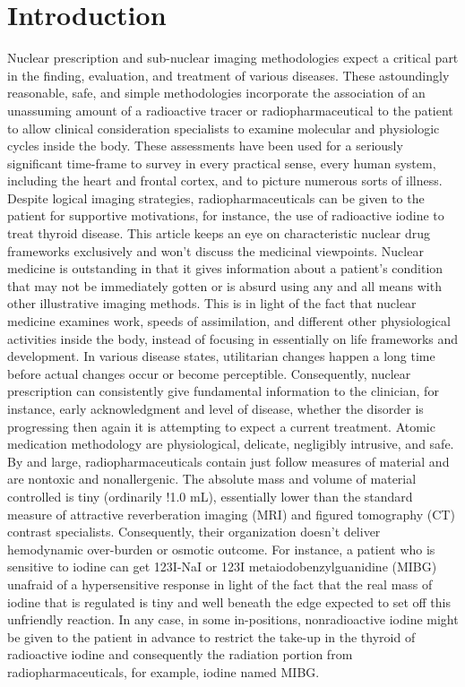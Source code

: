 \documentclass[12pt]{article}
\begin{document}
\section{Introduction}
Nuclear prescription and sub-nuclear imaging methodologies expect a critical part in the finding, evaluation, and treatment of various diseases. These astoundingly reasonable, safe, and simple methodologies incorporate the association of an unassuming amount of a radioactive tracer or radiopharmaceutical to the patient to allow clinical consideration specialists to examine	molecular and physiologic cycles inside the body. These assessments have been used for a seriously significant time-frame to survey in every practical sense, every human system, including the heart and frontal cortex, and to picture numerous sorts of illness. Despite logical imaging strategies, radiopharmaceuticals can be given to the patient for supportive motivations, for instance, the use of radioactive iodine to treat thyroid disease. This article keeps an eye on characteristic nuclear drug frameworks exclusively and won't discuss the medicinal viewpoints. Nuclear medicine is outstanding in that it gives information about a patient's condition that may not be immediately gotten or is absurd using any and all means with other illustrative imaging methods. This is in light of the fact that nuclear medicine examines work, speeds of assimilation, and different other physiological activities inside the body, instead of focusing in essentially on life frameworks and development. In various disease states, utilitarian changes happen a long time before actual changes occur or become perceptible. Consequently, nuclear prescription can consistently give fundamental information to the clinician, for instance, early acknowledgment and level of disease, whether the disorder is progressing then again it is attempting to expect a current treatment.
Atomic medication methodology are physiological, delicate, negligibly intrusive, and safe. By and large, radiopharmaceuticals contain just follow measures of material and are nontoxic and nonallergenic. The absolute mass and volume of material controlled is tiny (ordinarily !1.0 mL), essentially lower than the standard measure of attractive reverberation imaging (MRI) and figured tomography (CT) contrast specialists. Consequently, their organization doesn't deliver hemodynamic over-burden or osmotic outcome. For instance, a patient who is sensitive to iodine can get 123I-NaI or 123I metaiodobenzylguanidine (MIBG) unafraid of a hypersensitive response in light of the fact that the real mass of iodine that is regulated is tiny and well beneath the edge expected to set off this unfriendly reaction. In any case, in some in-positions, nonradioactive iodine might be given to the patient in advance to restrict the take-up in the thyroid of radioactive iodine and consequently the radiation portion from radiopharmaceuticals, for example, iodine named MIBG.
\end{document}
